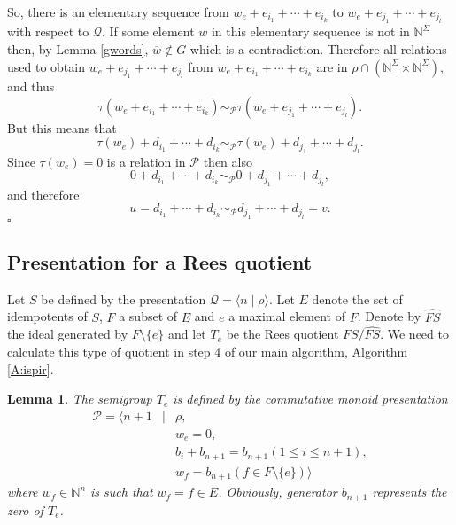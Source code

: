 \documentclass[12pt]{article}
\newtheorem{lemma}{\bf Lemma}
\newenvironment{proof}{{\it Proof.\/}}{$\square$\\}
\begin{document}
\begin{proof}
So, there is an elementary sequence from 
$w_e+e_{i_1}+\cdots+e_{i_k}$ to $w_e+e_{j_1}+\cdots +e_{j_l}$
with respect to $\mathcal{Q}$. If some element $w$ in this
elementary sequence is not in $\mathbb{N}^{\Sigma}$
then, by Lemma \ref{gwords}, $\overline{w} \notin G$ which is a 
contradiction. Therefore all relations used to obtain 
$w_e+e_{j_1}+\cdots +e_{j_l}$ from $w_e+e_{i_1}+\cdots+e_{i_k}$
are in $\rho\cap(\mathbb{N}^{\Sigma}\times\mathbb{N}^{\Sigma})$, and thus 
$$\tau(w_e+e_{i_1}+\cdots+e_{i_k})\sim_{\mathcal{P}}
\tau(w_e+e_{j_1}+\cdots +e_{j_l}).$$
But this means that
$$\tau(w_e)+d_{i_1}+\cdots+d_{i_k}\sim_{\mathcal{P}}
\tau(w_e)+d_{j_1}+\cdots +d_{j_l}.$$
Since $\tau(w_e)=0$ is a relation in $\mathcal{P}$ then also
$$0+d_{i_1}+\cdots+d_{i_k}\sim_{\mathcal{P}}
0+d_{j_1}+\cdots +d_{j_l},$$
and therefore
$$u=d_{i_1}+\cdots+d_{i_k}\sim_{\mathcal{P}}d_{j_1}+\cdots +d_{j_l}=v.$$
\end{proof}

\subsection{Presentation for a Rees quotient}\label{s:rqpres}

Let $S$ be defined by the presentation
${\mathcal Q}=\langle n\mid \rho\rangle$.
Let $E$ denote the set of idempotents of $S$, $F$ 
a subset of $E$ and $e$ a maximal element of $F$.
Denote by $\widehat{FS}$ the ideal generated by
$F\setminus \{e\}$ and let $T_e$ be the Rees quotient
$FS/\widehat{FS}$. We need to calculate this type of
quotient in step 4 of our main 
algorithm, Algorithm \ref{A:ispir}.

\begin{lemma}
The semigroup $T_e$ is defined by the  commutative monoid presentation
\begin{eqnarray*}
\mathcal{P}=\langle n+1&\mid& \rho,\\
&&w_e=0,\\
&&b_i+b_{n+1}=b_{n+1} (1\leq i\leq n+1),\\
&& w_f=b_{n+1} (f\in F\setminus\{e\})\rangle
\end{eqnarray*}
where $w_f\in \mathbb{N}^n$ is such that $\overline{w_f}=f\in E$.
Obviously, generator $b_{n+1}$ represents the zero of $T_e$.
\end{lemma}
\end{document}
